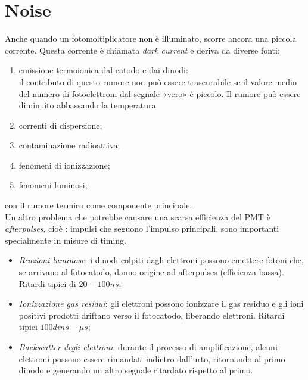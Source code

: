 \documentclass[12pt, letterpaper]{book}
\begin{document}
\section{Noise}
Anche quando un fotomoltiplicatore non è illuminato, scorre ancora una piccola corrente. Questa corrente è chiamata \textit{dark current} e deriva da diverse fonti:
\begin{enumerate}
    \item emissione termoionica dal catodo e dai dinodi:\\
    il contributo di questo rumore non può essere trascurabile se il valore medio del numero di fotoelettroni dal segnale «vero» è piccolo. Il rumore può essere diminuito abbassando la temperatura
    \item correnti di dispersione;
    \item contaminazione radioattiva;
    \item fenomeni di ionizzazione;
    \item fenomeni luminosi;
\end{enumerate}
con il rumore termico come componente principale.\\
Un altro problema che potrebbe causare una scarsa efficienza del PMT è \textit{afterpulses}, cioè : impulsi che seguono l’impulso principali, sono importanti specialmente in misure di timing.
\begin{itemize}
    \item \textit{Reazioni luminose}: i dinodi colpiti dagli elettroni possono emettere fotoni che, se arrivano al fotocatodo, danno origine ad afterpulses (efficienza bassa). Ritardi tipici di $20-100 ns$;
    \item \textit{Ionizzazione gas residui}: gli elettroni possono ionizzare il gas residuo e gli ioni positivi prodotti driftano verso il fotocatodo, liberando elettroni. Ritardi tipici $100 di ns - \mu s$;
    \item \textit{Backscatter degli elettroni}: durante il processo di amplificazione, alcuni elettroni possono essere rimandati indietro dall’urto, ritornando al primo dinodo e generando un altro segnale ritardato rispetto al primo.
\end{itemize}
\end{document}
